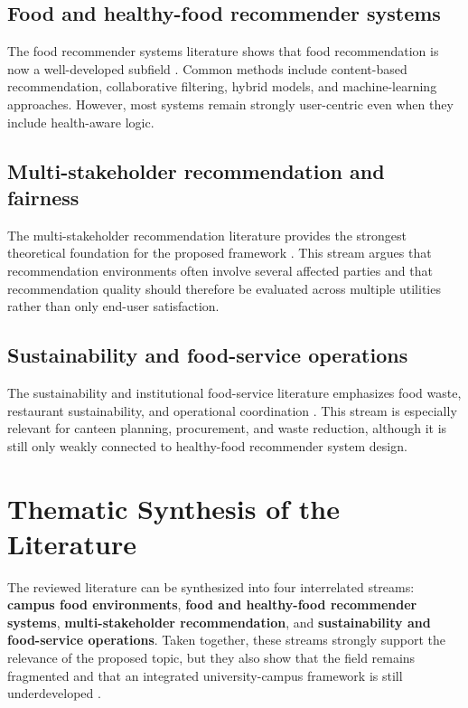 \subsection{Food and healthy-food recommender
systems}\label{food-and-healthy-food-recommender-systems}

The food recommender systems literature shows that food recommendation
is now a well-developed subfield
\citep{bondevik2024, tran2018healthy, trattner2017food}. Common methods
include content-based recommendation, collaborative filtering, hybrid
models, and machine-learning approaches. However, most systems remain
strongly user-centric even when they include health-aware logic.

\subsection{Multi-stakeholder recommendation and
fairness}\label{multi-stakeholder-recommendation-and-fairness}

The multi-stakeholder recommendation literature provides the strongest
theoretical foundation for the proposed framework
\citep{zheng2017msr, abdollahpouri2019fairness, wu2021multifr}. This
stream argues that recommendation environments often involve several
affected parties and that recommendation quality should therefore be
evaluated across multiple utilities rather than only end-user
satisfaction.

\subsection{Sustainability and food-service
operations}\label{sustainability-and-food-service-operations}

The sustainability and institutional food-service literature emphasizes
food waste, restaurant sustainability, and operational coordination
\citep{peixoto2026sustainability, guimaraes2024waste}. This stream is
especially relevant for canteen planning, procurement, and waste
reduction, although it is still only weakly connected to healthy-food
recommender system design.

\section{Thematic Synthesis of the
Literature}\label{thematic-synthesis-of-the-literature}

The reviewed literature can be synthesized into four interrelated
streams: \textbf{campus food environments}, \textbf{food and
healthy-food recommender systems}, \textbf{multi-stakeholder
recommendation}, and \textbf{sustainability and food-service
operations}. Taken together, these streams strongly support the
relevance of the proposed topic, but they also show that the field
remains fragmented and that an integrated university-campus framework is
still underdeveloped
\citep{bondevik2024, caruso2025campus, zheng2017msr, peixoto2026sustainability}.

